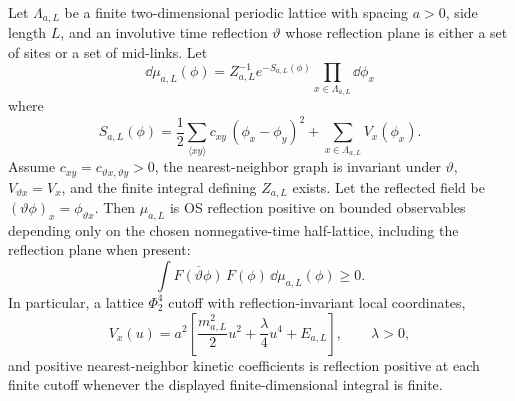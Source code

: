 \begin{proposition}
\label{prop:spde-lattice-cutoff-os-positive-regulator}
Let \(\Lambda_{a,L}\) be a finite two-dimensional periodic lattice with
spacing \(a>0\), side length \(L\), and an involutive time reflection
\(\vartheta\) whose reflection plane is either a set of sites or a set of
mid-links.  Let
\[
  \dd\mu_{a,L}(\phi)
  =
  Z_{a,L}^{-1}e^{-S_{a,L}(\phi)}
  \prod_{x\in\Lambda_{a,L}}\dd\phi_x
\]
where
\[
  S_{a,L}(\phi)
  =
  \frac12\sum_{\langle x y\rangle}
  c_{xy}\,(\phi_x-\phi_y)^2
  +
  \sum_{x\in\Lambda_{a,L}}V_x(\phi_x).
\]
Assume \(c_{xy}=c_{\vartheta x,\vartheta y}>0\), the nearest-neighbor graph
is invariant under \(\vartheta\), \(V_{\vartheta x}=V_x\), and the finite
integral defining \(Z_{a,L}\) exists.  Let the reflected field be
\((\vartheta\phi)_x=\phi_{\vartheta x}\).  Then \(\mu_{a,L}\) is OS
reflection positive on bounded observables depending only on the chosen
nonnegative-time half-lattice, including the reflection plane when present:
\[
  \int \overline{F(\vartheta\phi)}\,F(\phi)\,\dd\mu_{a,L}(\phi)\geq0 .
\]
In particular, a lattice \(\Phi^4_2\) cutoff with reflection-invariant local
coordinates,
\[
  V_x(u)
  =
  a^2\left[
    \frac{m_{a,L}^2}{2}u^2
    +\frac{\lambda}{4}u^4
    +E_{a,L}
  \right],
  \qquad \lambda>0,
\]
and positive nearest-neighbor kinetic coefficients is reflection positive at
each finite cutoff whenever the displayed finite-dimensional integral is
finite.
\end{proposition}

